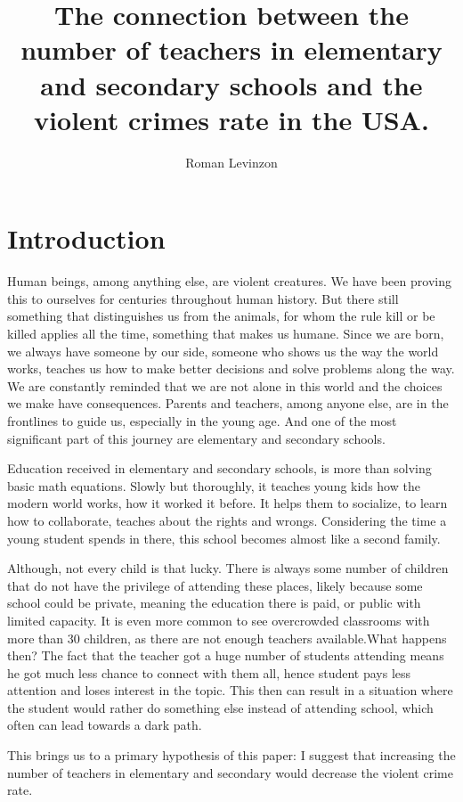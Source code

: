 \documentclass[thesis=B,english]{FITthesis}[2012/10/20]
\title{The connection between the number of teachers in elementary and secondary schools and the violent crimes rate in the USA.}
\author{Roman Levinzon} %
\begin{document}

\chapter{Introduction}
Human beings, among anything else, are violent creatures. We have been proving this to ourselves for centuries throughout human history. But there still something that distinguishes us from the animals, for whom the rule kill or be killed applies all the time, something that makes us humane. Since we are born, we always have someone by our side, someone who shows us the way the world works, teaches us how to make better decisions and solve problems along the way. We are constantly reminded that we are not alone in this world and the choices we make have consequences. Parents and teachers, among anyone else, are in the frontlines to guide us, especially in the young age. And one of the most significant part of this journey are elementary and secondary schools.

Education received in elementary and secondary schools, is more than solving basic math equations. Slowly but thoroughly, it teaches young kids how the modern world works, how it worked it before.  It helps them to socialize, to learn how to collaborate, teaches about the rights and wrongs. Considering the time a young student spends in there, this school becomes almost like a second family. 

Although, not every child is that lucky. There is always some number of children that do not have the privilege of attending these places, likely because some school could be private, meaning the education there is paid, or public with limited capacity.  It is even more common to see overcrowded classrooms with more than 30 children, as there are not enough teachers available.What happens then? The fact that the teacher got a huge number of students attending means he got much less chance to connect with them all, hence student pays less attention and loses interest in the topic. This then can result in a situation where the student would rather do something else instead of attending school, which often can lead towards a dark path.

This brings us to a primary hypothesis of this paper: I suggest that increasing the number of teachers in elementary and secondary would  decrease the violent crime rate.
\end{document}
